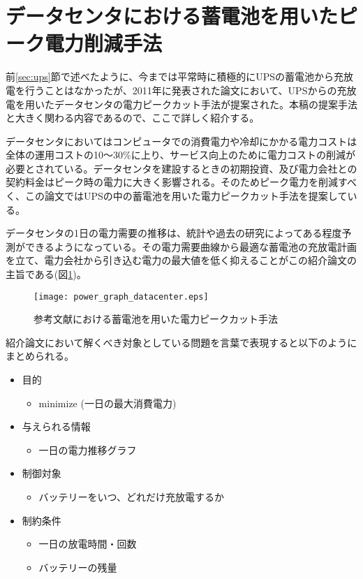 \section{データセンタにおける蓄電池を用いたピーク電力削減手法}
\label{sec:capping}

前\ref{sec:ups}節で述べたように、今までは平常時に積極的にUPSの蓄電池から充放電を行うことはなかったが、2011年に発表された論文\cite{Govindan:2011:BLT:2024723.2000105}において、UPSからの充放電を用いたデータセンタの電力ピークカット手法が提案された。本稿の提案手法と大きく関わる内容であるので、ここで詳しく紹介する。

データセンタにおいてはコンピュータでの消費電力や冷却にかかる電力コストは全体の運用コストの10〜30\%に上り、サービス向上のために電力コストの削減が必要とされている。データセンタを建設するときの初期投資、及び電力会社との契約料金はピーク時の電力に大きく影響される。そのためピーク電力を削減すべく、この論文ではUPSの中の蓄電池を用いた電力ピークカット手法を提案している。

データセンタの1日の電力需要の推移は、統計や過去の研究によってある程度予測ができるようになっている。その電力需要曲線から最適な蓄電池の充放電計画を立て、電力会社から引き込む電力の最大値を低く抑えることがこの紹介論文の主旨である(図\ref{fig:power_graph_datacenter})。
\begin{figure}[t]
 \begin{center}
  \texttt{[image: power\_graph\_datacenter.eps]}
 \end{center}
 \caption{参考文献\cite{Govindan:2011:BLT:2024723.2000105}における蓄電池を用いた電力ピークカット手法}
 \label{fig:power_graph_datacenter}
\end{figure}

紹介論文において解くべき対象としている問題を言葉で表現すると以下のようにまとめられる。

\begin{itemize}
  \item 目的
    \begin{itemize}
      \item minimize (一日の最大消費電力)
    \end{itemize}
  \item 与えられる情報
    \begin{itemize}
      \item 一日の電力推移グラフ
    \end{itemize}
  \item 制御対象
    \begin{itemize}
      \item バッテリーをいつ、どれだけ充放電するか
    \end{itemize}
  \item 制約条件
    \begin{itemize}
      \item 一日の放電時間・回数
      \item バッテリーの残量
    \end{itemize}
\end{itemize}

